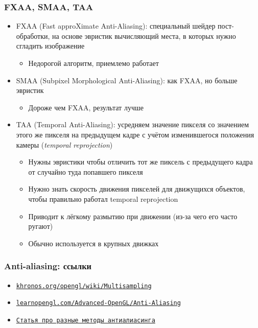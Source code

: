 \documentclass[10pt]{beamer}
\begin{document}
\begin{frame}[fragile]
\frametitle{FXAA, SMAA, TAA}
\begin{itemize}
\item FXAA (Fast approXimate Anti-Aliasing): специальный шейдер пост-обработки, на основе эвристик вычисляющий места, в которых нужно сгладить изображение
\begin{itemize}
\item Недорогой алгоритм, приемлемо работает
\end{itemize}
\pause
\item SMAA (Subpixel Morphological Anti-Aliasing): как FXAA, но больше эвристик
\begin{itemize}
\item Дороже чем FXAA, результат лучше
\end{itemize}
\pause
\item TAA (Temporal Anti-Aliasing): усредняем значение пикселя со значением этого же пикселя на предыдущем кадре с учётом изменившегося положения камеры (\textit{temporal reprojection})
\begin{itemize}
\item Нужны эвристики чтобы отличить тот же пиксель с предыдущего кадра от случайно туда попавшего пикселя
\item Нужно знать скорость движения пикселей для движущихся объектов, чтобы правильно работал temporal reprojection
\item Приводит к лёгкому размытию при движении (из-за чего его часто ругают)
\item Обычно используется в крупных движках
\end{itemize}
\end{itemize}
\end{frame}

\begin{frame}[fragile]
\frametitle{Anti-aliasing: ссылки}
\begin{itemize}
\item \href{https://www.khronos.org/opengl/wiki/Multisampling}{\texttt{khronos.org/opengl/wiki/Multisampling}}
\item \href{https://learnopengl.com/Advanced-OpenGL/Anti-Aliasing}{\texttt{learnopengl.com/Advanced-OpenGL/Anti-Aliasing}}
\item \href{https://www.digitaltrends.com/computing/what-is-anti-aliasing}{\texttt{Статья про разные методы антиалиасинга}}
\end{itemize}
\end{frame}
\end{document}
